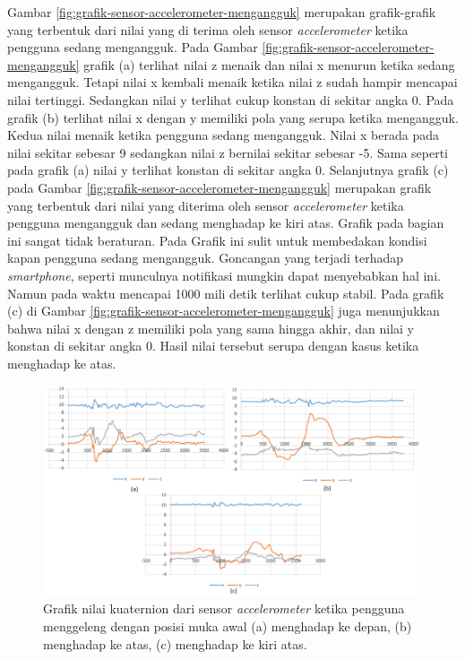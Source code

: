 Gambar \ref{fig:grafik-sensor-accelerometer-mengangguk} merupakan grafik-grafik yang terbentuk dari nilai yang di terima oleh sensor \textit{accelerometer} ketika pengguna sedang mengangguk. Pada Gambar \ref{fig:grafik-sensor-accelerometer-mengangguk} grafik (a) terlihat nilai z menaik dan nilai x menurun ketika sedang mengangguk. Tetapi nilai x kembali menaik ketika nilai z sudah hampir mencapai nilai tertinggi. Sedangkan nilai y terlihat cukup konstan di sekitar angka 0. Pada grafik (b) terlihat nilai x dengan y memiliki pola yang serupa ketika mengangguk. Kedua nilai menaik ketika pengguna sedang mengangguk. Nilai x berada pada nilai sekitar sebesar 9 sedangkan nilai z bernilai sekitar sebesar -5. Sama seperti pada grafik (a) nilai y terlihat konstan di sekitar angka 0. Selanjutnya grafik (c) pada Gambar \ref{fig:grafik-sensor-accelerometer-mengangguk} merupakan grafik yang terbentuk dari nilai yang diterima oleh sensor \textit{accelerometer} ketika pengguna mengangguk dan sedang menghadap ke kiri atas. Grafik pada bagian ini sangat tidak beraturan. Pada Grafik ini sulit untuk membedakan kondisi kapan pengguna sedang mengangguk. Goncangan yang terjadi terhadap \textit{smartphone}, seperti munculnya notifikasi mungkin dapat menyebabkan hal ini. Namun pada waktu mencapai 1000 mili detik terlihat cukup stabil. Pada grafik (c) di Gambar \ref{fig:grafik-sensor-accelerometer-mengangguk} juga menunjukkan bahwa nilai x dengan z memiliki pola yang sama hingga akhir, dan nilai y konstan di sekitar angka 0. Hasil nilai tersebut serupa dengan kasus ketika menghadap ke atas. 


\begin{figure}[htbp]
\centering
\includegraphics[scale=0.6]{Gambar/grafik-sensor-accelerometer-menggeleng.png}
\caption{Grafik nilai kuaternion dari sensor \textit{accelerometer} ketika pengguna menggeleng dengan posisi muka awal (a) menghadap ke depan, (b) menghadap ke atas, (c) menghadap ke kiri atas.} 
\label{fig:grafik-sensor-accelerometer-menggeleng}
\end{figure}

